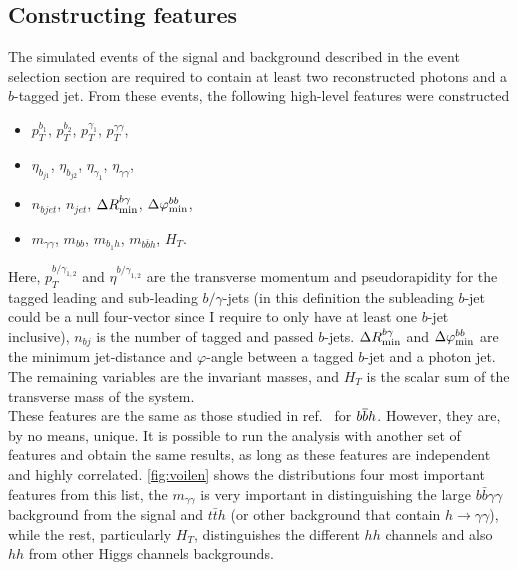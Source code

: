 \subsection{Constructing features \label{constructingfeat}}
The simulated events of the signal and background described in the event selection section are required to contain at least two reconstructed photons and  a $b$-tagged jet. From these events, the following high-level features were constructed
\begin{itemize}
	\setlength{\itemsep}{0pt}
	\item $p_T^{b_1}$, $p_T^{b_2}$, $p_T^{\gamma_1}$, $p_T^{\gamma\gamma}$, 
	\item $\eta_{b_{j1}}$, $\eta_{b_{j2}}$, $\eta_{\gamma_1}$, $\eta_{\gamma\gamma}$,
	\item $n_{bjet}$, $n_{jet}$, $\Delta R_{\rm min}^{b\gamma}$, $\Delta \varphi_{\rm min}^{bb}$, 
	\item $m_{\gamma\gamma}$, $m_{bb}$, $m_{b_{1} h}$, $m_{b\bar b h}$, $H_T$.
\end{itemize}
Here, $p_T^{{b/\gamma}_{1,2}}$ and $\eta^{{b/\gamma}_{1,2}}$ are the transverse momentum and pseudorapidity for the tagged leading and sub-leading $b/\gamma$-jets (in this definition the subleading $b$-jet could be a null four-vector since I require to only have at least one $b$-jet inclusive), $n_{bj}$ is the number of tagged and passed $b$-jets. $\Delta R_{\rm min}^{b\gamma}$ and $\Delta \varphi_{\rm min}^{bb}$ are the minimum jet-distance and $\varphi$-angle between a tagged $b$-jet and a photon jet. The remaining variables are the invariant masses, and $H_T$ is the scalar sum of the transverse mass of the system. \\ These features are the same as those studied in ref.~\cite{Grojean:2020ech} for $b\overline bh$. However, they are, by no means, unique. It is possible to run the analysis with another set of features and obtain the same results, as long as these features are independent and highly correlated. \autoref{fig:voilen} shows the distributions four most important features from this list, the $m_{\gamma \gamma}$ is very important in distinguishing the large $b \bar b \gamma \gamma$ background from the signal and $ t\bar t h$ (or other background that contain $ h \to \gamma \gamma$), while the rest, particularly $ H_T$, distinguishes the different $hh$ channels and also $hh$ from other Higgs channels backgrounds.  
